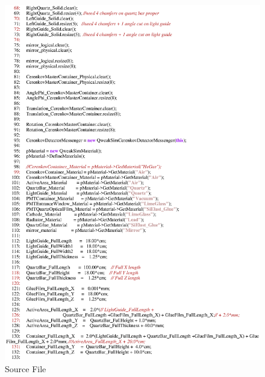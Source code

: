 \begin{figure}[ht]
  \hspace{0cm}
  \includegraphics[scale=0.8]{./figures5/QweakSimCerenkovDetector.cc-p2.eps}
  \caption{\label{SourceV2} Source File}
           \label{fig:V-SC-6}
\end{figure}
\clearpage

